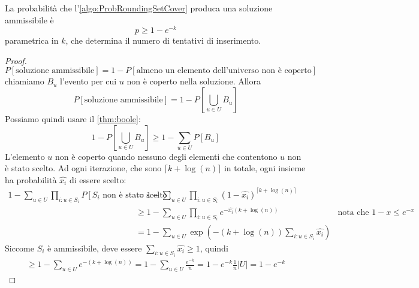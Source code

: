 \begin{theorem}
	La probabilità che l'\cref{algo:ProbRoundingSetCover} produca una soluzione ammissibile è
	$$
		p \geq 1 - e ^ {-k}
	$$
	parametrica in $k$, che determina il numero di tentativi di inserimento.
\end{theorem}
\begin{proof}
	$$
		P[\text{soluzione ammissibile}] = 1 - P[\text{almeno un elemento dell'universo non è coperto}]
	$$
	chiamiamo $B_u$ l'evento per cui $u$ non è coperto nella soluzione. Allora
	$$
		P[\text{soluzione ammissibile}] = 1 - P[\bigcup_{u \in U} B_u]
	$$
	Possiamo quindi usare il \cref{thm:boole}:
	$$
		1 - P[\bigcup_{u \in U} B_u] \geq 1 - \sum_{u \in U} P[B_u]
	$$
	L'elemento $u$ non è coperto quando nessuno degli elementi che contentono
	$u$ non è stato scelto. Ad ogni iterazione, che sono
	$\lceil k + \log(n) \rceil$ in totale, ogni insieme ha probabilità
	$\hat{x_i}$ di essere scelto:
	\begin{align*}
		1 - \sum_{u \in U} \prod_{i: u \in S_i} P[S_i \text{ non è stato scelto}] & = 1 - \sum_{u \in U} \prod_{i: u \in S_i} (1 - \hat{x_i})^{\lceil k + \log(n) \rceil}	\\
		& \geq 1 - \sum_{u \in U} \prod_{i : u \in S_i} e^{-\hat{x_i} (k + \log(n))} & \text{nota che } 1 - x \leq e^{-x}													\\
		& = 1 - \sum_{u \in U} \exp(- (k + \log (n)) \sum_{i: u \in S_i} \hat{x_i})
	\end{align*}
	Siccome $S_i$ è ammissibile, deve essere $\sum_{i: u \in S_i} \hat{x_i}  \geq 1$, quindi
	\begin{align*}
		\geq 1 - \sum_{u \in U} e^{- (k + \log(n))} = 1 - \sum_{u \in U} \frac{e^{-k}}{n}  = 1 - e^{-k} \frac{1}{n}|U| = 1 - e^{-k}
	\end{align*}
\end{proof}

